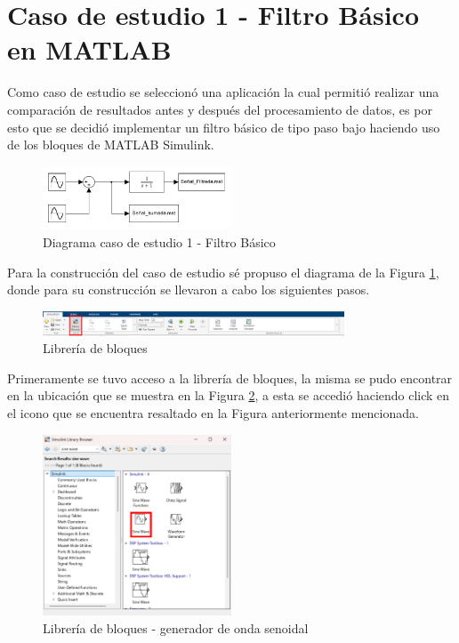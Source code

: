 \newpage

\section{Caso de estudio 1 - Filtro Básico en MATLAB}

Como caso de estudio se seleccionó una aplicación la cual permitió realizar una comparación de resultados antes y después del procesamiento de datos, es por esto que se decidió implementar un filtro básico de tipo paso bajo haciendo uso de los bloques de MATLAB Simulink. 

\begin{figure}[h!]
    \centering
    \includegraphics[width=0.5\textwidth]{fig/especifico_2/CASO_ESTUDIO_FILTRO/Diagrama matlab simulink.pdf}
    \caption{Diagrama caso de estudio 1 - Filtro Básico}
    \label{fig:diagrama_matlab_simulink}
\end{figure}

Para la construcción del caso de estudio sé propuso el diagrama de la Figura \ref{fig:diagrama_matlab_simulink}, donde para su construcción se llevaron a cabo los siguientes pasos.

\begin{figure}[h!]
    \centering
    \includegraphics[width=0.8\textwidth]{fig/especifico_2/CASO_ESTUDIO_FILTRO/libbroswer_0.pdf}
    \caption{Librería de bloques}
    \label{fig:lib_bloq}
\end{figure}

Primeramente se tuvo acceso a la librería de bloques, la misma se pudo encontrar en la ubicación que se muestra en la Figura \ref{fig:lib_bloq}, a esta se accedió haciendo click en el icono que se encuentra resaltado en la Figura anteriormente mencionada.



\begin{figure}[h!]
    \centering
    \includegraphics[width=0.5\textwidth]{fig/especifico_2/CASO_ESTUDIO_FILTRO/sinewave_0.pdf}
    \caption{Librería de bloques - generador de onda senoidal}
    \label{fig:lib_bloq_sine}
\end{figure}

